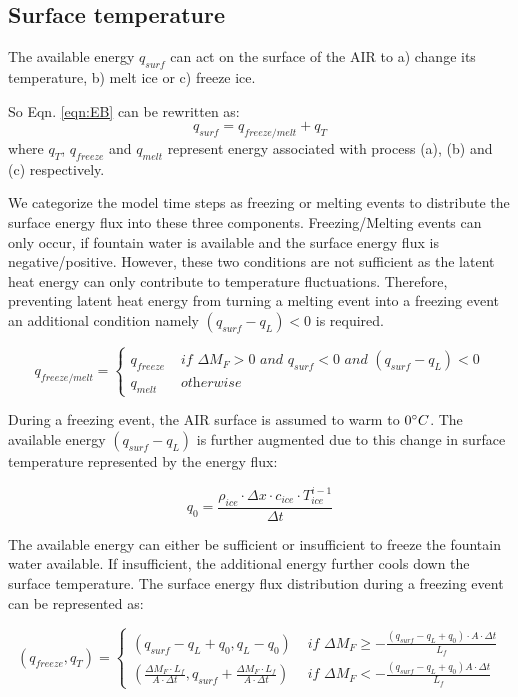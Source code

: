 \documentclass[utf8]{frontiersSCNS} %
\begin{document}
\subsection{Surface temperature}

The available energy $q_{surf}$ can act on the surface of the AIR to a) change its temperature, b) melt ice or c) freeze
ice.

So Eqn. \ref{eqn:EB} can be rewritten as: \begin{equation} q_{surf} = q_{freeze/melt} + q_{T} \end{equation} where
$q_{T}$, $q_{freeze}$ and $q_{melt}$ represent energy associated with process (a), (b) and (c) respectively.

We categorize the model time steps as freezing or melting events to distribute the surface energy flux into these three
components. Freezing/Melting events can only occur, if fountain water is available and the surface energy flux is
negative/positive. However, these two conditions are not sufficient as the latent heat energy can only contribute to
temperature fluctuations. Therefore, preventing latent heat energy from turning a melting event into a freezing event an
additional condition namely $(q_{surf}-q_{L}) < 0$ is required.

\begin{equation}
	q_{freeze/melt} = \left\{ \begin{array}{ll}
		q_{freeze} & \textit{ if } \Delta M_{F} > 0 \textit{ and } q_{surf} < 0 \textit{ and }(q_{surf}-q_{L}) < 0 \\
		q_{melt}   & \textit{ otherwise}
	\end{array} \right.
\end{equation}

During a freezing event, the AIR surface is assumed to warm to $0 \degree C$. The available energy $(q_{surf}-q_{L})$ is
further augmented due to this change in surface temperature represented by the energy flux:

$$q_{0} = \frac{\rho_{ice} \cdot \Delta x \cdot c_{ice} \cdot T_{ice}^{i-1}}{\Delta t}$$

The available energy can either be sufficient or insufficient to freeze the fountain water available. If
insufficient, the additional energy further cools down the surface temperature. The surface energy flux
distribution during a freezing event can be represented as:

\begin{equation}
	(q_{freeze}, q_{T}) = \left\{ \begin{array}{ll}
		(q_{surf}-q_{L}+q_{0}, q_{L}-q_{0}) & \textit{ if } \Delta M_{F} \geq -\frac{(q_{surf}-q_{L}+q_{0}) \cdot A \cdot \Delta
		t}{L_f}                                                                                                                  \\
		(\frac{\Delta M_{F} \cdot L_f
		}{A \cdot \Delta t}
		, q_{surf}+\frac{\Delta M_{F} \cdot L_f
		}{A \cdot \Delta t})                & \textit{ if } \Delta M_{F} < -\frac{(q_{surf}-q_{L}+q_0) A \cdot \Delta
		t}{L_f}
	\end{array} \right.
\end{equation}
\end{document}
